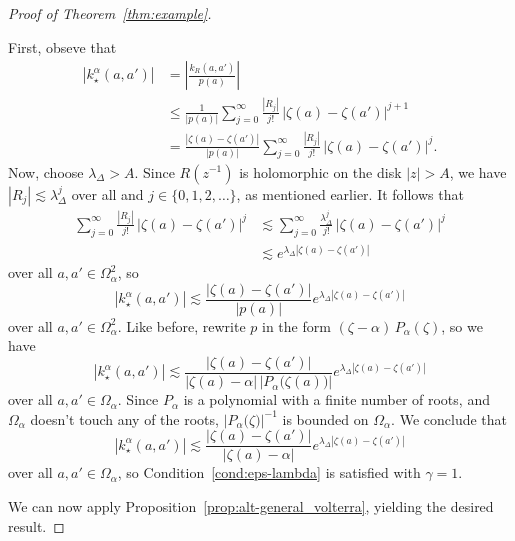 \documentclass{article}
\theoremstyle{plain}
\newcommand{\softker}{k_\star}
\newcommand{\domain}{\Omega}
\begin{document}
\begin{proof}[Proof of Theorem~\ref{thm:example}]
\begin{itemize}
First, obseve that
\begin{align*}
|\softker^\alpha(a, a')| & = \left|\frac{k_R(a, a')}{p(a)}\right| \\
& \le \frac{1}{|p(a)|} \sum_{j=0}^\infty \frac{|R_{j}|}{j!} \, |\zeta(a)-\zeta(a')|^{j+1} \\
& = \frac{|\zeta(a)-\zeta(a')|}{|p(a)|} \sum_{j=0}^\infty \frac{|R_{j}|}{j!} \, |\zeta(a)-\zeta(a')|^j.
\end{align*}
Now, choose $\lambda_\Delta > A$. Since $R(z^{-1})$ is holomorphic on the disk $|z| > A$, we have $|R_j| \lesssim \lambda_\Delta^j$ over all and $j \in \{0, 1, 2, \ldots\}$, as mentioned earlier. It follows that
\begin{align*}
\sum_{j=0}^\infty \frac{|R_{j}|}{j!} \, |\zeta(a)-\zeta(a')|^j
& \lesssim \sum_{j=0}^\infty \frac{\lambda_\Delta^j}{j!} \, |\zeta(a)-\zeta(a')|^j \\
& \lesssim e^{\lambda_\Delta|\zeta(a)-\zeta(a')|}
\end{align*}
over all $a, a' \in \domain_\alpha^2$, so
\[ |\softker^\alpha(a, a')| \lesssim \frac{|\zeta(a)-\zeta(a')|}{|p(a)|} e^{\lambda_\Delta|\zeta(a)-\zeta(a')|} \]
over all $a, a' \in \domain_\alpha^2$. Like before, rewrite $p$ in the form $(\zeta - \alpha)\,P_\alpha(\zeta)$, so we have
\[ |\softker^\alpha(a, a')| \lesssim \frac{|\zeta(a)-\zeta(a')|}{|\zeta(a) - \alpha|\,\big|P_\alpha\big(\zeta(a)\big)\big|} e^{\lambda_\Delta|\zeta(a)-\zeta(a')|} \]
over all $a, a' \in \domain_\alpha$. Since $P_\alpha$ is a polynomial with a finite number of roots, and $\domain_\alpha$ doesn't touch any of the roots, $\big|P_\alpha\big(\zeta\big)\big|^{-1}$ is bounded on $\domain_\alpha$. We conclude that
\[ |\softker^\alpha(a, a')| \lesssim \frac{|\zeta(a)-\zeta(a')|}{|\zeta(a) - \alpha|} e^{\lambda_\Delta|\zeta(a)-\zeta(a')|} \]
over all $a, a' \in \domain_\alpha$, so Condition~\eqref{cond:eps-lambda} is satisfied with $\gamma = 1$.
\end{itemize}
We can now apply Proposition~\ref{prop:alt-general_volterra}, yielding the desired result.
\end{proof}



\end{document}
